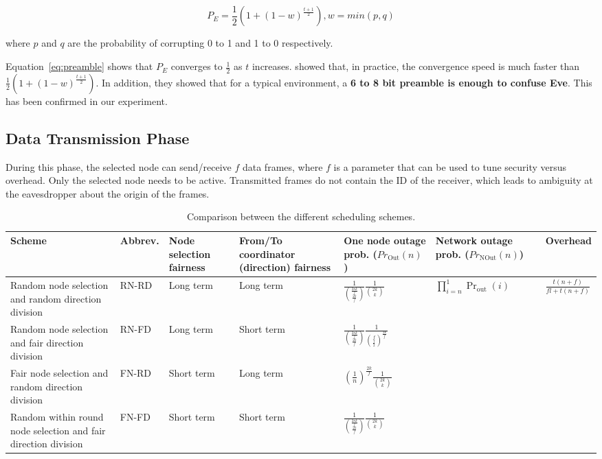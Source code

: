 \documentclass[10pt,letterpaper,conference]{IEEEtran}
\begin{document}
\begin{equation}
P_E= \frac{1}{2}\left ( 1 + \left ( 1-w \right )^{\frac{t+1}{2}} \right ), w = min (p, q)
\label{eq:preamble}
\end{equation}

where $p$ and $q$ are the probability of corrupting 0 to 1 and 1 to 0 respectively.

Equation~\ref{eq:preamble} shows that $P_E$ converges to $\frac{1}{2}$ as $t$ increases. \cite{Arora2009} showed that, in practice, the convergence speed is
much faster than $\frac{1}{2}\left ( 1 + \left ( 1-w \right )^{\frac{t+1}{2}} \right )$. In addition, they showed that for a typical environment, a \textbf{6 to 8 bit preamble is enough to confuse Eve}. This has been confirmed in our experiment.

\subsection{Data Transmission Phase}

During this phase, the selected node can send/receive $f$ data frames, where $f$
is a parameter that can be used to tune security versus overhead. Only the
selected node needs to be active. Transmitted frames do not contain the ID of
the receiver, which leads to ambiguity at the eavesdropper about the origin of
the frames. 

\begin{table*}[!t]
\centering
\caption{Comparison between the different scheduling schemes.}
\begin{tabular}{|p{3cm}||l|p{2cm}|p{2cm}|p{2cm}|p{2cm}|l|}
\hline
Scheme  & Abbrev. & Node selection fairness & From/To coordinator (direction)
fairness& One node outage prob. ($Pr_{\textrm{Out}}(n)$)& Network outage prob.
($Pr_{\textrm{NOut}}(n)$)& Overhead\\
\hline
\hline
Random node selection and random direction division & RN-RD & Long term & Long
term &
$\left.\frac{1}{\binom{\frac{2nk}{f}}{\frac{2k}{f}}}\right.{\frac{1}{\binom{2k}{
k}}}$ & \multirow{4}{*}{$\prod_{i=n}^{1}\Pr_{\textrm{out}}(i)$}  &
\multirow{4}{*}{$\frac{t(n+f)}{fl+t(n+f)}$}\\
\cline{1-5}
Random node selection and fair direction division & RN-FD & Long term & Short
term &
$\left.\frac{1}{\binom{\frac{2nk}{f}}{\frac{2k}{f}}}\right.{\frac{1}{\binom{f}{
\frac{f}{2}}^{\frac{2k}{f}}}}$ & & \\
\cline{1-5}
Fair node selection and random direction division & FN-RD &
Short term & Long term &
$\left.{\left(\frac{1}{n}\right)^{\frac{2k}{f}}}\right.{\frac{1}{\binom{2k}{k}}}
$ &  & \\
\cline{1-5}
Random within round node selection and fair direction division & FN-FD & Short
term & Short term &
$\left.\frac{1}{\binom{\frac{2nk}{f}}{\frac{2k}{f}}}\right.{\frac{1}{\binom{2k}{
k}}}$ &  & \\
\hline
\end{tabular}
\label{tab:schemes}
\end{table*}
\end{document}
